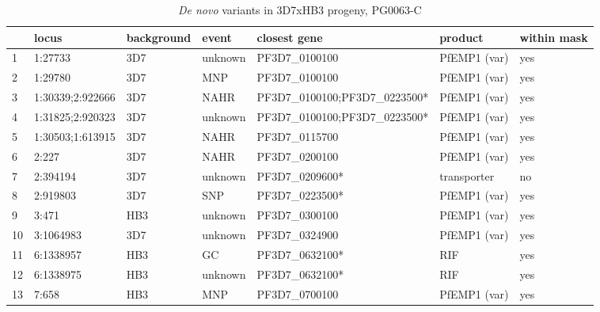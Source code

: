\begin{landscape}
\begin{table}[]
\centering
\caption{\textit{De novo} variants in 3D7xHB3 progeny, PG0063-C}
\label{tbl:callsPG0063C}
\begin{tabular}{@{}lllllll@{}}
\toprule
       & locus               & background &  event    &  closest gene                   &  product          &  within mask  \\
\midrule
1      & 1:27733             & 3D7        &  unknown  &  PF3D7\_0100100                 &  PfEMP1 (var)     &  yes          \\
2      & 1:29780             & 3D7        &  MNP      &  PF3D7\_0100100                 &  PfEMP1 (var)     &  yes          \\
3      & 1:30339;2:922666    & 3D7        &  NAHR     &  PF3D7\_0100100;PF3D7\_0223500* &  PfEMP1 (var)     &  yes          \\
4      & 1:31825;2:920323    & 3D7        &  unknown  &  PF3D7\_0100100;PF3D7\_0223500* &  PfEMP1 (var)     &  yes          \\
5      & 1:30503;1:613915    & 3D7        &  NAHR     &  PF3D7\_0115700                 &  PfEMP1 (var)     &  yes          \\
6      & 2:227               & 3D7        &  NAHR     &  PF3D7\_0200100                 &  PfEMP1 (var)     &  yes          \\
7      & 2:394194            & 3D7        &  unknown  &  PF3D7\_0209600*                &  transporter      &  no           \\
8      & 2:919803            & 3D7        &  SNP      &  PF3D7\_0223500*                &  PfEMP1 (var)     &  yes          \\
9      & 3:471               & HB3        &  unknown  &  PF3D7\_0300100                 &  PfEMP1 (var)     &  yes          \\
10     & 3:1064983           & 3D7        &  unknown  &  PF3D7\_0324900                 &  PfEMP1 (var)     &  yes          \\
11     & 6:1338957           & HB3        &  GC       &  PF3D7\_0632100*                &  RIF              &  yes          \\
12     & 6:1338975           & HB3        &  unknown  &  PF3D7\_0632100*                &  RIF              &  yes          \\
13     & 7:658               & HB3        &  MNP      &  PF3D7\_0700100                 &  PfEMP1 (var)     &  yes          \\

\end{tabular}
\end{table}
\end{landscape}
